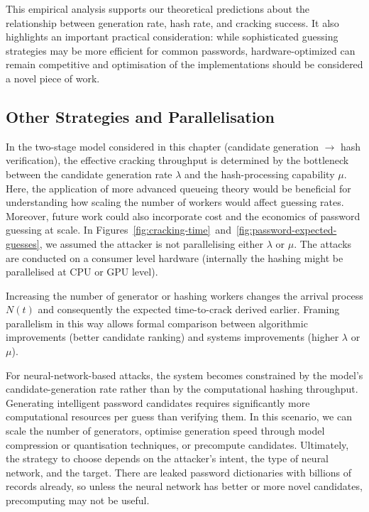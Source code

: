 This empirical analysis supports our theoretical predictions about the relationship between generation rate, hash rate, and cracking success. It also highlights an important practical consideration: while sophisticated guessing strategies may be more efficient for common passwords, hardware-optimized can remain competitive and optimisation of the implementations should be considered a novel piece of work.

\subsection{Other Strategies and Parallelisation}

In the two-stage model considered in this chapter (candidate generation \(\rightarrow\) hash verification), the effective cracking throughput is determined by the bottleneck between the candidate generation rate \(\lambda\) and the hash-processing capability \(\mu\). Here, the application of more advanced queueing theory would be beneficial for understanding how scaling the number of workers would affect guessing rates. Moreover, future work could also incorporate cost and the economics of password guessing at scale. In Figures~\ref{fig:cracking-time}~and~\ref{fig:password-expected-guesses}, we assumed the attacker is not parallelising either \(\lambda\) or \(\mu\). The attacks are conducted on a consumer level hardware (internally the hashing might be parallelised at CPU or GPU level).

Increasing the number of generator or hashing workers changes the arrival process \(N(t)\) and consequently the expected time-to-crack derived earlier. Framing parallelism in this way allows formal comparison between algorithmic improvements (better candidate ranking) and systems improvements (higher \(\lambda\) or \(\mu\)).

For neural-network-based attacks, the system becomes constrained by the model’s candidate-generation rate rather than by the computational hashing throughput. Generating intelligent password candidates requires significantly more computational resources per guess than verifying them. In this scenario, we can scale the number of generators, optimise generation speed through model compression or quantisation techniques, or precompute candidates. Ultimately, the strategy to choose depends on the attacker’s intent, the type of neural network, and the target. There are leaked password dictionaries with billions of records already, so unless the neural network has better or more novel candidates, precomputing may not be useful.

